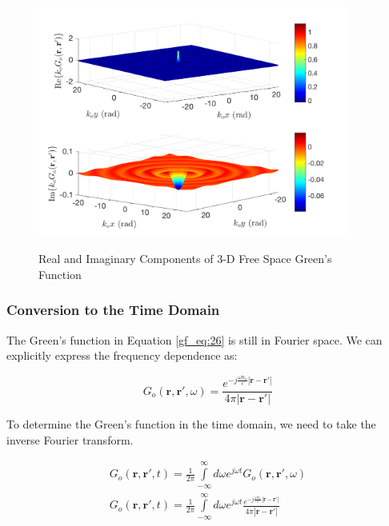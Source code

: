 \begin{figure}[ht]
\centering
\includegraphics[width=4in]{../media/3d_fs_gf_re_im.png}
\renewcommand{\baselinestretch}{1}
\small\normalsize
\begin{quote}
\caption[Real and Imaginary Components of 3-D Free Space Green's Function]{Real and Imaginary Components of 3-D Free Space Green's Function \label{gf_fig:2}}
\end{quote}
\end{figure} 
\renewcommand{\baselinestretch}{2}
\small\normalsize

\subsubsection {Conversion to the Time Domain}
The Green's function in Equation \ref{gf_eq:26} is still in Fourier space. We can explicitly express the frequency dependence as:

\begin{equation}
G_o\left(\mathbf{r},\mathbf{r}',\omega\right) = \frac{e^{-j\frac{\omega n_r}{c}|\mathbf{r} - \mathbf{r}'|}}{4\pi |\mathbf{r} - \mathbf{r}'|}
\label{gf_eq:28}
\end{equation}
\renewcommand{\baselinestretch}{2} \small\normalsize

\noindent To determine the Green's function in the time domain, we need to take the inverse Fourier transform.

\begin{equation}
\begin{gathered}
G_o\left(\mathbf{r},\mathbf{r}',t\right) = \frac{1}{2\pi}\int\limits_{-\infty}^{\infty}d\omega e^{j\omega t}G_o\left(\mathbf{r},\mathbf{r}',\omega\right) \\
G_o\left(\mathbf{r},\mathbf{r}',t\right) = \frac{1}{2\pi}\int\limits_{-\infty}^{\infty}d\omega e^{j\omega t}  \frac{e^{-j\frac{\omega n_r}{c}|\mathbf{r}-\mathbf{r}'|}}{4\pi |\mathbf{r}-\mathbf{r}'|}\\
\end{gathered}
\label{gf_eq:29}
\end{equation}
\renewcommand{\baselinestretch}{2} \small\normalsize

